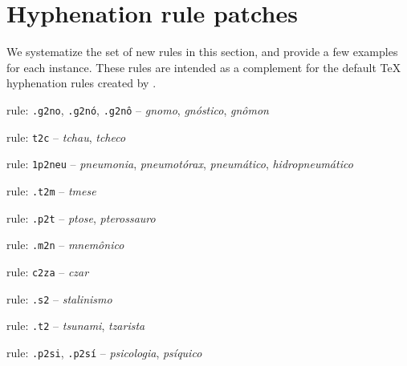\section{Hyphenation rule patches}\label{sec-hyph-rpatches}
We systematize the set of new rules in this section, and provide a few examples for
each instance. These rules are intended as a complement for the default \TeX{} hyphenation
rules created by \cite{hyphpt}. 


\begin{rules}
\item\label{rulegrp_gno} rule: \texttt{.g2no}, \texttt{.g2nó}, \texttt{.g2nô} -- \emph{gnomo}, \emph{gnóstico}, \emph{gnômon}

\item\label{rulegrp_tc} rule: \texttt{t2c} -- \emph{tchau}, \emph{tcheco}

\item\label{rulegrp_pneu} rule: \texttt{1p2neu} -- \emph{pneumonia}, \emph{pneumotórax}, \emph{pneumático}, \emph{hidropneumático}

\item\label{rulegrp_tm} rule: \texttt{.t2m} -- \emph{tmese}
   
\item\label{rulegrp_pt} rule: \texttt{.p2t} -- \emph{ptose}, \emph{pterossauro}

\item\label{rulegrp_mn} rule: \texttt{.m2n} -- \emph{mnemônico}

\item\label{rulegrp_cza} rule: \texttt{c2za} -- \emph{czar}

\item\label{rulegrp_s2} rule: \texttt{.s2} -- \emph{stalinismo}

\item\label{rulegrp_t2} rule: \texttt{.t2} -- \emph{tsunami}, \emph{tzarista}

\item\label{rulegrp_psi} rule: \texttt{.p2si}, \texttt{.p2sí} -- \emph{psicologia}, \emph{psíquico} %


\end{rules}

